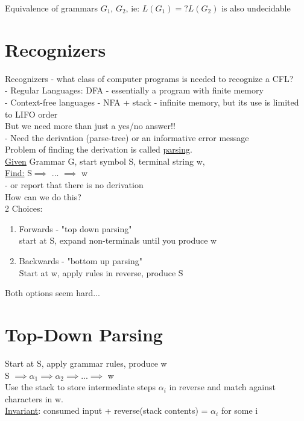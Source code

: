 \documentclass[12pt]{article}
\begin{document}
	 Equivalence of grammars $G_1$, $G_2$, ie: $L(G_1) =? L(G_2)$ is also undecidable\\
	 
	 \section*{Recognizers}
	 
	 Recognizers - what class of computer programs is needed to recognize a CFL?\\
	 
	 - Regular Languages: DFA - essentially a program with finite memory\\
	 
	 - Context-free languages - NFA + stack - infinite memory, but its use is limited to LIFO order\\
	 
	 But we need more than just a yes/no answer!!\\
	 - Need the derivation (parse-tree) or an informative error message\\
	 
	 Problem of finding the derivation is called \underline{parsing}.\\
	 \underline{Given} Grammar G, start symbol S, terminal string w,\\
	 \underline{Find:} S$\implies$ ... $\implies$ w \\
	 - or report that there is no derivation\\
	 
	 How can we do this?\\
	 
	 2 Choices:\\
	 \begin{enumerate}
	 	\item Forwards - "top down parsing"\\
		 	start at S, expand non-terminals until you produce w
	 	\item Backwards - "bottom up parsing"\\
		 	Start at w, apply rules in reverse, produce S
	 \end{enumerate}
	 
	 Both options seem hard...\\
	 
	 \section*{Top-Down Parsing}
	 
	 Start at S, apply grammar rules, produce w\\
	 
	 S $\implies \alpha_1 \implies \alpha_2 \implies ... \implies$ w\\
	 
	 Use the stack to store intermediate steps $\alpha_i$ in reverse and match against characters in w.\\
	 
	 \underline{Invariant}: consumed input + reverse(stack contents) = $\alpha_i$ for some i\\
	
	
\end{document}

